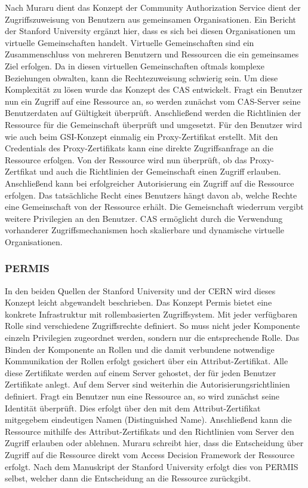\documentclass[utf8,biblatex]{lni}
\begin{document}
Nach Muraru \citet{Muraru.o.J} dient das Konzept der Community Authorization Service dient der Zugriffszuweisung von Benutzern aus gemeinsamen Organisationen. Ein Bericht der Stanford University \citet{Pearlman.28.03.2003} ergänzt hier, dass es sich bei diesen Organisationen
um virtuelle Gemeinschaften handelt. Virtuelle Gemeinschaften sind ein Zusammenschluss von mehreren Benutzern und Ressourcen die ein gemeinsames Ziel erfolgen. Da 
in diesen virtuellen Gemeinschaften oftmals komplexe Beziehungen obwalten, kann die Rechtezuweisung schwierig sein. Um diese Komplexität zu lösen wurde das Konzept des CAS entwickelt.
Fragt ein Benutzer nun ein Zugriff auf eine Ressource an, so werden zunächst vom CAS-Server seine Benutzerdaten auf Gültigkeit überprüft. Anschließend werden die Richtlinien der Ressource für die Gemeinschaft überprüft und 
umgesetzt. Für den Benutzer wird wie auch beim GSI-Konzept einmalig ein Proxy-Zertifikat erstellt. Mit den Credentials des Proxy-Zertifikats kann eine direkte Zugriffsanfrage 
an die Ressource erfolgen. Von der Ressource wird nun überprüft, ob das Proxy-Zertfikat und auch die Richtlinien der Gemeinschaft einen Zugriff erlauben. Anschließend kann bei
erfolgreicher Autorisierung ein Zugriff auf die Ressource erfolgen. Das tatsächliche Recht eines Benutzers hängt davon ab, welche Rechte eine Gemeinschaft von der Ressource erhält. Die Gemeisnchaft 
wiederrum vergibt weitere Privilegien an den Benutzer.  CAS ermöglicht durch die Verwendung vorhanderer Zugriffsmechanismen hoch skalierbare und dynamische virtuelle 
Organisationen. \citet{Pearlman.28.03.2003} \citet{Muraru.o.J}

\subsubsection{PERMIS}
In den beiden Quellen der Stanford University \citet{Pearlman.28.03.2003} und der CERN \citet{Muraru.o.J} wird dieses Konzept leicht abgewandelt beschrieben.
Das Konzept Permis bietet eine konkrete Infrastruktur mit rollembasierten Zugriffsystem. 
 Mit jeder verfügbaren Rolle sind verschiedene Zugriffsrechte definiert. So muss nicht jeder
Komponente einzeln Privilegien zugeordnet werden, sondern nur die entsprechende Rolle. Das Binden der Komponente an Rollen und die damit verbundene notwendige Kommunikation der Rollen 
erfolgt gesichert über ein Attribut-Zertifikat. Alle diese Zertifikate werden auf einem Server gehostet, der für jeden Benutzer Zertifikate anlegt. Auf dem Server sind weiterhin
die Autorisierungsrichtlinien definiert. Fragt ein Benutzer nun eine Ressource an, so wird
zunächst seine Identität überprüft. Dies erfolgt über den mit dem Attribut-Zertifikat mitgegebem eindeutigen Namen (Distinguished Name). Anschließend kann die Ressource mithilfe des Attribut-Zertifikats und den Richtlinien vom Server den Zugriff erlauben oder ablehnen. Muraru \citet{Muraru.o.J} schreibt hier, dass
die Entscheidung über Zugriff auf die Ressource direkt vom Access Decision Framework der Ressource erfolgt. Nach dem Manuskript der Stanford University \citet{Pearlman.28.03.2003} erfolgt dies von PERMIS selbst, welcher dann die Entscheidung an die Ressource zurückgibt.
\end{document}
